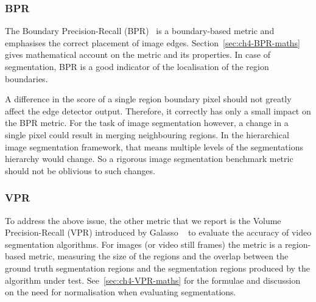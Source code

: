 \subsubsection*{BPR}
The Boundary Precision-Recall (BPR)~\cite{Arbelaez11} is a boundary-based metric and emphasises the correct placement of image edges. Section~\ref{sec:ch4-BPR-maths} gives mathematical account on the metric and its properties. In case of segmentation, BPR is a good indicator of the localisation of the region boundaries.

A difference in the score of a single region boundary pixel should not greatly affect the edge detector output. Therefore, it correctly has only a small impact on the BPR metric. For the task of image segmentation however, a change in a single pixel could result in merging neighbouring regions. In the hierarchical image segmentation framework, that means multiple levels of the segmentations hierarchy would change. So a rigorous image segmentation benchmark metric should not be oblivious to such changes.

\subsubsection*{VPR}
To address the above issue, the other metric that we report is the Volume Precision-Recall (VPR) introduced by Galasso \etal~\cite{Galasso13} to evaluate the accuracy of video segmentation algorithms. For images (or video still frames) the metric is a region-based metric, measuring the size of the regions and the overlap between the ground truth segmentation regions and the segmentation regions produced by the algorithm under test. 
See~\ref{sec:ch4-VPR-maths} for the formulae and discussion on the need for normalisation when evaluating segmentations.


